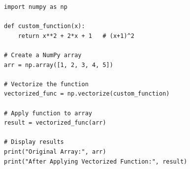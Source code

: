 \begin{verbatim}
import numpy as np

def custom_function(x):
    return x**2 + 2*x + 1   # (x+1)^2

# Create a NumPy array
arr = np.array([1, 2, 3, 4, 5])

# Vectorize the function
vectorized_func = np.vectorize(custom_function)

# Apply function to array
result = vectorized_func(arr)

# Display results
print("Original Array:", arr)
print("After Applying Vectorized Function:", result)
\end{verbatim}